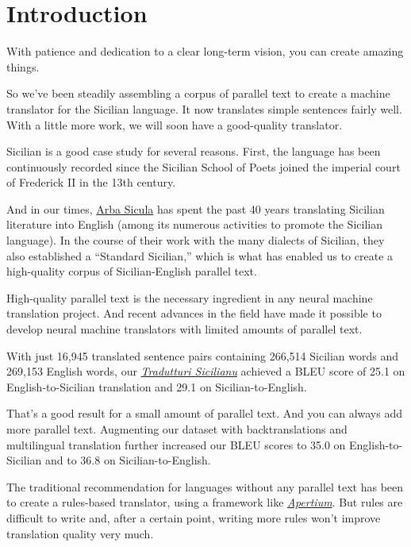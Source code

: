 \documentclass[10pt,letterpaper]{article}
\begin{document}


\section{Introduction}

With patience and dedication to a clear long-term vision, you can create amazing things.

So we've been steadily assembling a corpus of parallel text to create a machine translator for the Sicilian language. 
It now translates simple sentences fairly well. With a little more work, we will soon have a good-quality translator.

Sicilian is a good case study for several reasons. First, the language has been continuously recorded since the 
Sicilian School of Poets joined the imperial court of Frederick II in the 13th century.

And in our times, \href{https://www.arbasicula.org/}{Arba Sicula}
has spent the past 40 years translating Sicilian literature into English
(among its numerous activities to promote the Sicilian language).
In the course of their work with the many dialects of Sicilian, they also established a ``Standard Sicilian,''
which is what has enabled us to create a high-quality corpus of Sicilian-English parallel text.

High-quality parallel text is the necessary ingredient in any neural machine translation project.
And recent advances in the field have made it possible to develop neural machine translators with
limited amounts of parallel text.

With just 16,945 translated sentence pairs containing 266,514 Sicilian words and 269,153 English words,
our \href{https://translate.napizia.com/}{\textit{Tradutturi Sicilianu}}
achieved a BLEU score of 25.1 on English-to-Sicilian translation and 29.1 on Sicilian-to-English.
      
That's a good result for a small amount of parallel text.  And you can always add more parallel text.
Augmenting our dataset with backtranslations and multilingual translation further increased our
BLEU scores to 35.0 on English-to-Sicilian and to 36.8 on Sicilian-to-English.

The traditional recommendation for languages without any parallel text has been to create
a rules-based translator, using a framework like
\href{https://www.apertium.org/}{\textit{Apertium}}.
But rules are difficult to write and, after a certain point,
writing more rules won't improve translation quality very much.
\end{document}
